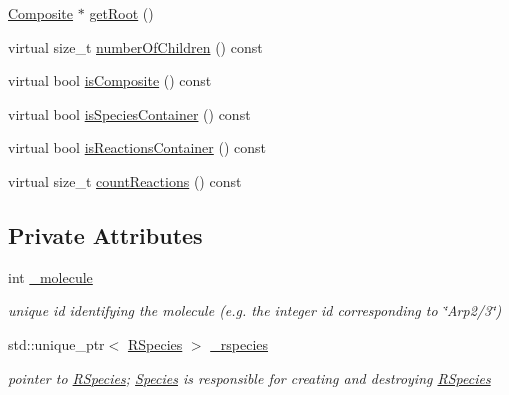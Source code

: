 \begin{DoxyCompactItemize}
\item 
\hyperlink{classchem_1_1Composite}{Composite} $\ast$ \hyperlink{classchem_1_1Component_a7f1166f8fb4c9526cd1794ec3c2714f5}{get\-Root} ()
\item 
virtual size\-\_\-t \hyperlink{classchem_1_1Component_a720ec4ef4aaadfec3e47c31451d28637}{number\-Of\-Children} () const 
\item 
virtual bool \hyperlink{classchem_1_1Component_af2c73f75f937d457a55c1e0120833cb8}{is\-Composite} () const 
\item 
virtual bool \hyperlink{classchem_1_1Component_a3c0f652fe5b6910f07c046fe0190b7b5}{is\-Species\-Container} () const 
\item 
virtual bool \hyperlink{classchem_1_1Component_a8c79ee4335fadfcef56b14a62b742457}{is\-Reactions\-Container} () const 
\item 
virtual size\-\_\-t \hyperlink{classchem_1_1Component_ab061b8b7d97db554af402ebb9723dc4c}{count\-Reactions} () const 
\end{DoxyCompactItemize}
\subsection*{Private Attributes}
\begin{DoxyCompactItemize}
\item 
int \hyperlink{classchem_1_1Species_afc69264ab4c24ac17b7d1946b1b380f4}{\-\_\-molecule}
\begin{DoxyCompactList}\small\item\em unique id identifying the molecule (e.\-g. the integer id corresponding to \char`\"{}\-Arp2/3\char`\"{}) \end{DoxyCompactList}\item 
std\-::unique\-\_\-ptr$<$ \hyperlink{classchem_1_1RSpecies}{R\-Species} $>$ \hyperlink{classchem_1_1Species_ae6e8e6ad9e05b4eb3f28cf20249caa67}{\-\_\-rspecies}
\begin{DoxyCompactList}\small\item\em pointer to \hyperlink{classchem_1_1RSpecies}{R\-Species}; \hyperlink{classchem_1_1Species}{Species} is responsible for creating and destroying \hyperlink{classchem_1_1RSpecies}{R\-Species} \end{DoxyCompactList}\end{DoxyCompactItemize}
